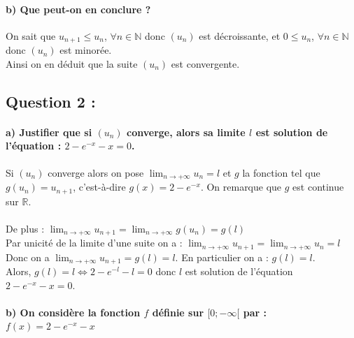 \documentclass[a4paper, 12pt]{article}
\begin{document}
{}
\paragraph*{b) Que peut-on en conclure ?\\[5mm]}

On sait que $u_{n+1} \leq u_n$, $\forall n \in \mathbb{N}$ donc $(u_n)$ est décroissante, et $0 \leq u_n$, $\forall n \in \mathbb{N}$ donc $(u_n)$ est minorée. 
\\
Ainsi on en déduit que la suite $(u_n)$ est convergente.

{}
\subsection*{Question 2 :}

{}
\paragraph*{a) Justifier que si $(u_n)$ converge, alors sa limite $l$ est solution de l'équation : $2 - e^{-x}-x=0$.\\[5mm]}

Si $(u_n)$ converge alors on pose $\displaystyle \lim_{n \to +\infty}u_n=l$ et $g$ la fonction tel que $g(u_n) = u_{n+1}$, c'est-à-dire $g(x) = 2 - e^{-x}$.
On remarque que $g$ est continue sur $\mathbb{R}$.
\\ \\
De plus : $\displaystyle \lim_{n \to +\infty} u_{n+1} = \displaystyle \lim_{n \to +\infty} g(u_n) = g(l)$ \\[2mm]
Par unicité de la limite d'une suite on a : $\displaystyle \lim_{n \to +\infty} u_{n+1} = \displaystyle \lim_{n \to +\infty} u_n = l$ \\[2mm]
Donc on a $\displaystyle \lim_{n \to +\infty} u_{n+1} = g(l) = l$. En particulier on a : $g(l) = l$.
\\
Alors, $g(l) = l \iff 2 - e^{-l} - l = 0$ donc $l$ est solution de l'équation $2 - e^{-x}-x=0$.

{}
\paragraph*{b) On considère la fonction $f$ définie sur $[0;-\infty[$ par : $f(x)=2-e^{-x}-x$\\[5mm]}
\end{document}

